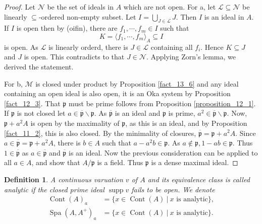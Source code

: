\documentclass[8pt]{article}
\numberwithin{equation}{section}
\newtheorem{definition}{Definition}[subsection]
\DeclareMathOperator{\supp}{supp}
\DeclareMathOperator{\Spa}{Spa}
\DeclareMathOperator{\Cont}{Cont}
\newcommand{\sep}[0]{\:|\:}
\newcommand{\p}[0]{\mathfrak{p}}
\begin{document}
\begin{proof}
    Let $\mathcal{N}$ be the set of ideals in $A$ which are not open. For a, let $\mathcal{L}\subseteq\mathcal{N}$ be linearly $\subseteq$-ordered non-empty subset. Let $I = \bigcup_{J\in\mathcal{L}}J$. Then $I$ is an ideal in $A$. If $I$ is open then by (oifin), there are $f_1,\cdots,f_m\in I$ such that 
    \begin{equation*}
        K = \langle f_1,\cdots,f_m\rangle_A \subseteq I
    \end{equation*}
    is open. As $\mathcal{L}$ is linearly orderd, there is $J\in\mathcal{L}$ containing all $f_i$. Hence $K\subseteq J$ and $J$ is open. This contradicts to that $J\in\mathcal{N}$. Applying Zorn's lemma, we derived the statement.
    \par For b, $\mathcal{M}$ is closed under product by Proposition \ref{fact_13_6} and any ideal containing an open ideal is also open, it is an Oka system by Proposition \ref{fact_12_3}. That $\p$ must be prime follows from Proposition \ref{proposition_12_1}. 
    If $\p$ is not closed let $a\in\overline{\p}\backslash\p$. As $\overline{\p}$ is an ideal and $\p$ is prime, $a^2\in\overline{\p}\backslash\p$. Now, $\p+a^2A$ is open by the maximality of $\p$, as this is an ideal, and by Proposition \ref{fact_11_2}, this is also closed. By the minimality of closures, $\overline{\p} = \p+a^2A$. 
    Since $a\in\overline{\p} = \p+a^2A$, there is $b\in A$ such that $a - a^2b\in\p$. As $a\not\in\p, 1 -ab\in \p$. Thus $1\in\overline{\p}$ as $a\in\overline{\p}$ and $\overline{\p}$ is an ideal.
    Now the previous consideration can be applied to all $a\in A$, and show that $A/\p$ is a field. Thus $\p$ is a dense maximal ideal.
\end{proof}

\begin{definition}
    \label{definition_15_7}
    A continuous varuation $v$ of $A$ and its equivalence class is called analytic if the closed prime ideal $\supp v$ fails to be open. We denote
    \begin{align*}
        \Cont(A)_a &= \{x\in\Cont(A)\sep \text{$x$ is analytic}\},\\
        \Spa(A,A^+)_a &= \{x\in\Cont(A)\sep\text{$x$ is analytic}\}.
    \end{align*}
\end{definition}
\end{document}
